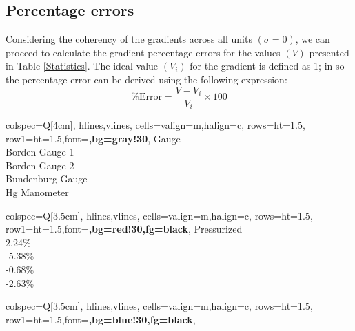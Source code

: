 \documentclass{article}
\begin{document}
	\subsection{Percentage errors}
	Considering the coherency of the {gradients} across all units $\left(\sigma=0\right)$, we can proceed to calculate the gradient percentage errors for the {values} $(V)$ presented in Table \ref{Statistics}. The {ideal} value $(V_i)$ for the gradient is defined as 1; in so the percentage error can be derived using the following expression:\\[0.7em]
	\begin{equation}
		\% \text{Error} = \frac{V - V_i}{V_i} \times 100
	\end{equation}
\vspace{1em}
	\begin{center}	
		\hspace*{-1em}
	\begin{minipage}[t]{3cm}
		\centering
		\begin{tblr}{
				colspec={Q[4cm]},
				hlines,vlines,
				cells={valign=m,halign=c},
				rows={ht=1.5\baselineskip},
				row{1}={ht=1.5\baselineskip,font=\bfseries,bg=gray!30},
			}
			Gauge \\
			Borden Gauge 1 \\
			Borden Gauge 2 \\
			Bundenburg Gauge \\
			Hg Manometer \\
		\end{tblr}
	\end{minipage}
	\hspace{3.5em}
	\begin{minipage}[t]{3.5cm}
		\centering
		\begin{tblr}{
				colspec={Q[3.5cm]},
				hlines,vlines,
				cells={valign=m,halign=c},
				rows={ht=1.5\baselineskip},
				row{1}={ht=1.5\baselineskip,font=\bfseries,bg=red!30,fg=black},
			}
			Pressurized \\
			{2.24\%}\\
			{-5.38\%} \\
			{-0.68\%} \\
			{-2.63\%} \\
		\end{tblr}
	\end{minipage}
	\hspace{1em}
	\begin{minipage}[t]{3.5cm}
		\centering
		\begin{tblr}{
				colspec={Q[3.5cm]},
				hlines,vlines,
				cells={valign=m,halign=c},
				rows={ht=1.5\baselineskip},
				row{1}={ht=1.5\baselineskip,font=\bfseries,bg=blue!30,fg=black},
			}

\end{tblr}
\end{minipage}
\end{center}
\end{document}
